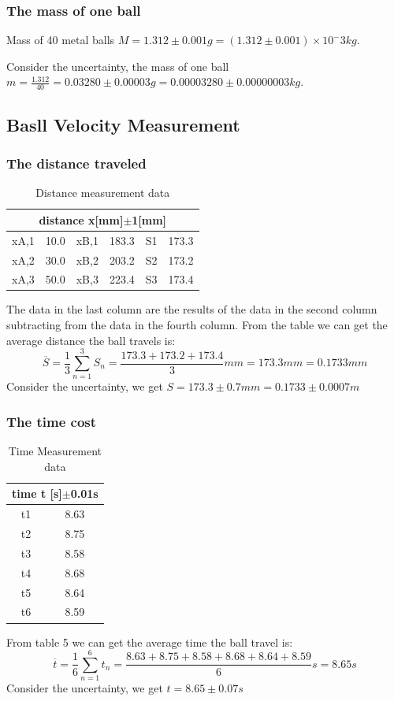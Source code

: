 \documentclass[12pt,a4paper]{article}
\begin{document}
\subsubsection{The mass of one ball}
Mass of 40 metal balls $M=1.312\pm0.001g=(1.312\pm 0.001)\times 10^-3kg$.\par
Consider the uncertainty, the mass of one ball $m=\frac{1.312}{40}=0.03280\pm 0.00003g=0.00003280 \pm 0.00000003kg$.

\subsection{Basll Velocity Measurement}
\subsubsection{The distance traveled}

\begin{table}[h]
    \centering
    \begin{tabular}{|c|c|c|c|c|c|}
        \hline
        \multicolumn{6}{|c|}{distance x[mm]$\pm$1[mm]} \\
        \hline
        xA,1 & 10.0 & xB,1 & 183.3 & S1 & 173.3 \\
        \hline
        xA,2 & 30.0 & xB,2 & 203.2 & S2 & 173.2 \\
        \hline
        xA,3 & 50.0 & xB,3 & 223.4 & S3 & 173.4 \\
        \hline
    \end{tabular}
    \caption{Distance measurement data}
\end{table}
The data in the last column are the results of the data in the second column subtracting from the data in the fourth column.
From the table we can get the average distance the ball travels is:
$$\overline{S}=\frac{1}{3}\sum^3_{n=1}S_n=\frac{173.3+173.2+173.4}{3}mm=173.3mm=0.1733mm$$
Consider the uncertainty, we get $S= 173.3\pm0.7mm=0.1733\pm0.0007m$

\subsubsection{The time cost}
\begin{table}[h]
    \centering
    \begin{tabular}{|c|c|}
        \hline
        \multicolumn{2}{|c|}{time t [s]$\pm$0.01s} \\
        \hline
        t1 & 8.63 \\
        \hline  
        t2 & 8.75 \\
        \hline 
        t3 & 8.58 \\
        \hline
        t4 & 8.68 \\
        \hline 
        t5 & 8.64 \\
        \hline
        t6 & 8.59 \\
        \hline
    \end{tabular}
    \caption{Time Measurement data}
\end{table}
From table 5 we can get the average time the ball travel is: 
$$\overline{t}=\frac{1}{6}\sum^6_{n=1}t_n=\frac{8.63+8.75+8.58+8.68+8.64+8.59}{6}s=8.65s$$
Consider the uncertainty, we get $t=8.65\pm 0.07s$
\end{document}
